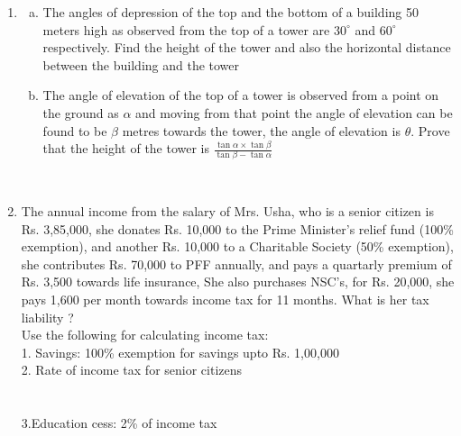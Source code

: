 \documentclass[journal,12pt,twocolumn]{IEEEtran}
\begin{document}
\begin{enumerate}[label=1.\arabic*]
\begin{enumerate}[label=2.\arabic*]
\begin{enumerate}[label=3.\arabic*]
\item \begin{enumerate}[a)]
\item The angles of depression of the top and the bottom of a building 50 meters high as observed from the top of a tower are $30^\circ$ and $60^\circ$ respectively. Find the height of the tower and also the horizontal distance between the building and the tower\\
\item The angle of elevation of the top of a tower is observed from a point on the ground as $\alpha$ and moving from that point the angle of elevation can be found to be $\beta$ metres towards the tower, the angle of elevation is $\theta$. Prove that the height of the tower is \( \frac{\tan \alpha \times \tan \beta}{\tan \beta - \tan \alpha}\)\\
\end{enumerate}
\vspace{1mm}\\
\item The annual income from the salary of Mrs. Usha, who is a senior citizen is Rs. 3,85,000, she donates Rs. 10,000 to the Prime Minister's relief fund (100\% exemption), and another Rs. 10,000 to a Charitable Society (50\% exemption), she contributes Rs. 70,000 to PFF annually, and pays a quartarly premium of Rs. 3,500 towards life insurance, She also purchases NSC's, for Rs. 20,000, she pays 1,600 per month towards income tax for 11 months. What is her tax liability ?\\
Use the following for calculating income tax:\\
1. Savings: 100\% exemption for savings upto Rs. 1,00,000\\
2. Rate of income tax for senior citizens\\
\vspace{1mm}\\
\vspace{1mm}\\
3.Education cess: 2\% of  income tax\\
\end{enumerate}
\end{enumerate}
\end{enumerate}
\end{document}
